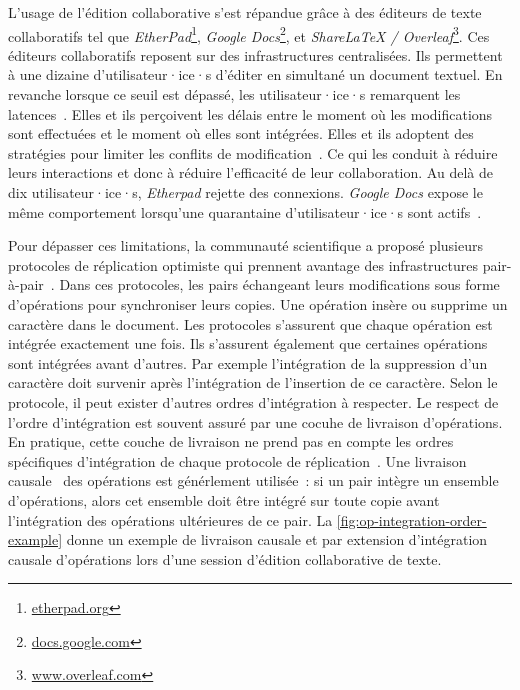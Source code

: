 L'usage de l'édition collaborative s'est répandue grâce à des éditeurs de texte collaboratifs tel que \emph{EtherPad}\footnote{\href{https://etherpad.org}{etherpad.org}}, \emph{Google Docs}\footnote{\href{https://docs.google.com}{docs.google.com}}, et \emph{ShareLaTeX / Overleaf}\footnote{\href{https://www.overleaf.com}{www.overleaf.com}}.
Ces éditeurs collaboratifs reposent sur des infrastructures centralisées.
Ils permettent à une dizaine d'utilisateur·ice·s d'éditer en simultané un document textuel.
En revanche lorsque ce seuil est dépassé, les utilisateur·ice·s remarquent les latences~\autocite{dang2016performance}.
Elles et ils perçoivent les délais entre le moment où les modifications sont effectuées et le moment où elles sont intégrées.
Elles et ils adoptent des stratégies pour limiter les conflits de modification~\autocite{ignat_2015_user-and-delay,ignat2014_delayeffect}.
Ce qui les conduit à réduire leurs interactions et donc à réduire l'efficacité de leur collaboration.
Au delà de dix utilisateur·ice·s, \emph{Etherpad} rejette des connexions.
\emph{Google Docs} expose le même comportement lorsqu'une quarantaine d'utilisateur·ice·s sont actifs~\autocite{dang2016performance}.

Pour dépasser ces limitations, la communauté scientifique a proposé plusieurs protocoles de réplication optimiste qui prennent avantage des infrastructures pair-à-pair~\autocite{ahmednacer2011evaluatingcrdts,oster_2006_woot,preguica_2009_treedoc,weiss2010logoot,roh_2011_rga,andre_2013_logootsplit,nicolaescu2015yjs,briot_2016_rgasplit}.
Dans ces protocoles, les pairs échangeant leurs modifications sous forme d'opérations pour synchroniser leurs copies.
Une opération insère ou supprime un caractère dans le document.
Les protocoles s'assurent que chaque opération est intégrée exactement une fois.
Ils s'assurent également que certaines opérations sont intégrées avant d'autres.
Par exemple l'intégration de la suppression d'un caractère doit survenir après l'intégration de l'insertion de ce caractère.
Selon le protocole, il peut exister d'autres ordres d'intégration à respecter.
Le respect de l'ordre d'intégration est souvent assuré par une cocuhe de livraison d'opérations.
En pratique, cette couche de livraison ne prend pas en compte les ordres spécifiques d'intégration de chaque protocole de réplication~\autocite{shapiro_2011_crdt,shapiro2011_comprehensive}.
Une livraison causale~\autocite{prakash_1997_barrierbarrier} des opérations est générlement utilisée~: si un pair intègre un ensemble d'opérations, alors cet ensemble doit être intégré sur toute copie avant l'intégration des opérations ultérieures de ce pair.
La \autoref{fig:op-integration-order-example} donne un exemple de livraison causale et par extension d'intégration causale d'opérations lors d'une session d'édition collaborative de texte.

